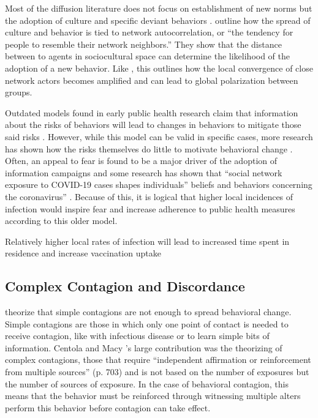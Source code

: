 Most of the diffusion literature does not focus on establishment of new norms
but the adoption of culture and specific deviant behaviors \citep[see][for an
exception]{centolaSpontaneousEmergenceConventions2015}.
\citet{dellapostaWhyLiberalsDrink2015} outline how the spread of culture and
behavior is tied to network autocorrelation, or ``the tendency for people to
resemble their network neighbors.'' They show that the distance between to
agents in sociocultural space can determine the likelihood of the adoption of a
new behavior. Like \citet{axelrodDisseminationCultureModel1997}, this outlines
how the local convergence of close network actors becomes amplified and can lead
to global polarization between groups.

Outdated models found in early public health research claim that information
about the risks of behaviors will lead to changes in behaviors to mitigate those
said risks \citep[e.g.][]{flay_etal80}. However, while this model can be valid
in specific cases, more research has shown how the risks themselves do little to
motivate behavioral change \citep{witte_allen00,wolburg06}. Often, an appeal to
fear is found to be a major driver of the adoption of information campaigns and
some research has shown that ``social network exposure to COVID-19 cases shapes
individuals'' beliefs and behaviors concerning the coronavirus''
\citep{bailey_etal20}. Because of this, it is logical that higher local
incidences of infection would inspire fear and increase adherence to public
health measures according to this older model.

\begin{hyp2} \label{hyp:infection}
 Relatively higher local rates of infection will lead to increased time spent in residence and increase vaccination uptake
\end{hyp2}


\hypertarget{complex-contagion-and-discordance}{\subsection{Complex Contagion and Discordance}\label{complex-contagion-and-discordance}}

\citep{centolaComplexContagionsWeakness2007} theorize that simple contagions are
not enough to spread behavioral change. Simple contagions are those in which
only one point of contact is needed to receive contagion, like with infectious
disease or to learn simple bits of information. Centola and Macy
\citeyearpar{centolaComplexContagionsWeakness2007}'s large contribution was the
theorizing of complex contagions, those that require ``independent affirmation
or reinforcement from multiple sources'' (p. 703) and is not based on the number
of exposures but the number of sources of exposure. In the case of behavioral
contagion, this means that the behavior must be reinforced through witnessing
multiple alters perform this behavior before contagion can take effect.

